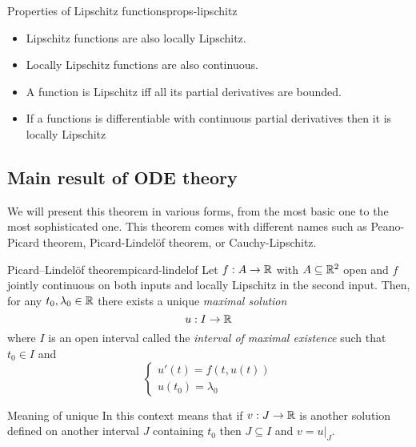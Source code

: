 \documentclass[12pt]{extarticle}
\begin{document}
\begin{proposition}{Properties of Lipschitz functions}{props-lipschitz}
    \begin{itemize}
        \item Lipschitz functions are also locally Lipschitz.
        \item Locally Lipschitz functions are also continuous.
        \item A function is Lipschitz iff all its partial derivatives are bounded.
        \item If a functions is differentiable with continuous partial derivatives then it is locally Lipschitz
    \end{itemize}
\end{proposition}

\subsection{Main result of ODE theory}

We will present this theorem in various forms, from the most basic one to the most sophisticated one.
This theorem comes with different names such as Peano-Picard theorem, Picard-Lindelöf theorem, or Cauchy-Lipschitz.

\begin{theorem}{Picard–Lindelöf theorem}{picard-lindelof}
    Let $f: A \to \mathbb{R}$ with $A \subseteq \mathbb{R}^2$ open and $f$ jointly continuous on both inputs and locally Lipschitz in the second input.
    Then, for any $t_0, \lambda_0 \in \mathbb{R}$ there exists a unique \emph{maximal solution}
    \begin{equation}
        u: I \to \mathbb{R}
    \end{equation}
    where $I$ is an open interval called the \emph{interval of maximal existence} such that $t_0 \in I$ and
    \begin{equation}
        \begin{cases}
            u'(t) = f(t, u(t)) \\
            u(t_0) = \lambda_0
        \end{cases}
    \end{equation}
\end{theorem}

\begin{remark}{Meaning of unique}{}
    In this context  means that if $v: J \to \mathbb{R}$ is another solution defined on another interval $J$ containing $t_0$ then $J \subseteq I$ and $v = u|_J$.
\end{remark}
\end{document}
